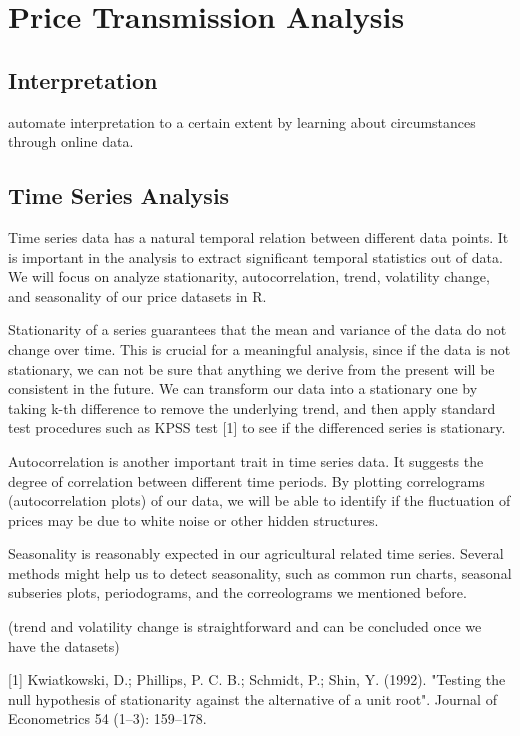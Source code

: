 \section*{Price Transmission Analysis}

\subsection*{Interpretation}
automate interpretation to a certain extent by learning about circumstances through online data.


\subsection*{Time Series Analysis}
Time series data has a natural temporal relation between different data points.
It is important in the analysis to extract significant temporal statistics out
of data. We will focus on analyze stationarity, autocorrelation, trend, volatility
change, and seasonality of our price datasets in R.

Stationarity of a series guarantees that the mean and variance of the data do not
change over time. This is crucial for a meaningful analysis, since if the data is
not stationary, we can not be sure that anything we derive from the present will
be consistent in the future. We can transform our data into a stationary one by
taking k-th difference to remove the underlying trend, and then apply standard
test procedures such as KPSS test [1] to see if the differenced series is stationary.

Autocorrelation is another important trait in time series data. It suggests the
degree of correlation between different time periods. By plotting correlograms
(autocorrelation plots) of our data, we will be able to identify if the fluctuation
of prices may be due to white noise or other hidden structures.

Seasonality is reasonably expected in our agricultural related time series. Several
methods might help us to detect seasonality, such as common run charts, seasonal
subseries plots, periodograms, and the correolograms we mentioned before.

(trend and volatility change is straightforward and can be concluded once we have the datasets)

[1] Kwiatkowski, D.; Phillips, P. C. B.; Schmidt, P.; Shin, Y. (1992). "Testing the null hypothesis of stationarity against the alternative of a unit root". Journal of Econometrics 54 (1–3): 159–178.


